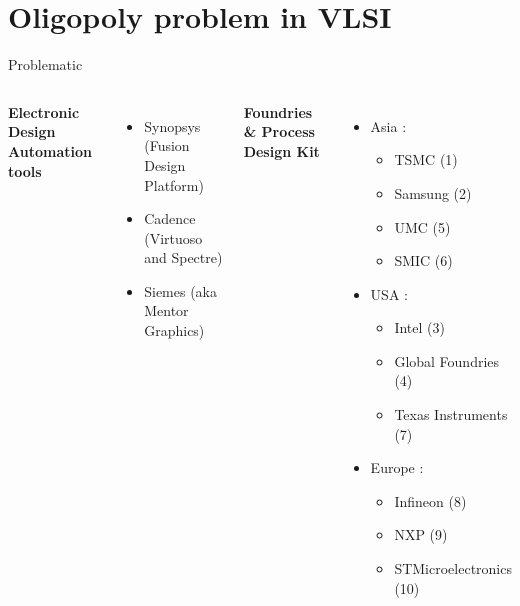 \section{Oligopoly problem in VLSI}
\begin{frame}{Problematic}{\insertsection}
    \begin{columns}
        \centering
        \textbf{Electronic Design Automation tools}
        \begin{itemize}
            \item Synopsys (Fusion Design Platform)
            \item Cadence (Virtuoso and Spectre)
            \item Siemes (aka Mentor Graphics)
        \end{itemize}

        \centering
        \textbf{Foundries \cite{noauthor_top_nodate} \& Process Design Kit}
        \begin{itemize}
            \item Asia :
            \begin{itemize}
                \item TSMC (1)
                \item Samsung (2)
                \item UMC (5)
                \item SMIC (6)
            \end{itemize}
            \item USA :
            \begin{itemize}
                \item Intel (3)
                \item Global Foundries (4)
                \item Texas Instruments (7)
            \end{itemize}
            \item Europe :
            \begin{itemize}
                \item Infineon (8)
                \item NXP (9)
                \item STMicroelectronics (10)
            \end{itemize}
        \end{itemize}
    \end{columns}
\end{frame}

